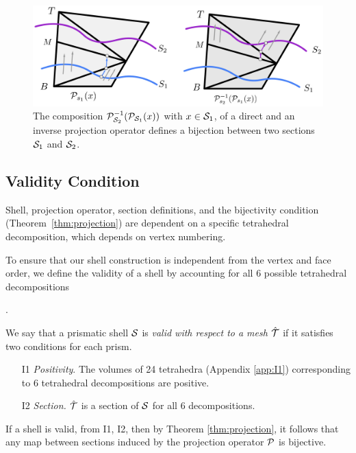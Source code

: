 
\begin{figure}
    \includegraphics[width=\linewidth]{prism-tex/figs/composition}
    \caption{The composition $\P^{-1}_{\S_2}(\P_{\S_1}(x))$ with $x \in \S_1$, of a direct and an inverse projection operator defines a bijection between two sections $\S_1$ and $\S_2$.}
    \label{prism:fig:projection_sections}
    
\end{figure}

{
\subsection{Validity Condition}
\label{prism:sec:strong}

Shell, projection operator, section definitions, and the bijectivity condition (Theorem~\ref{thm:projection}) are dependent on a specific tetrahedral decomposition, which depends on vertex numbering.

To ensure that our shell construction is independent from the vertex and face order, we define the validity of a shell by accounting for all 6 possible tetrahedral decompositions \cite[Figure 4]{dompierre1999subdivide}}.

\begin{definition}\label{def:validshell}
We say that a prismatic shell $\S$ is \emph{valid with respect to a mesh $\hat\T$} if it satisfies two conditions for each prism.
\begin{enumerate}
    \item[I1] \emph{Positivity}. The volumes of  24 tetrahedra (Appendix \ref{app:I1}) corresponding to  6 tetrahedral decompositions are positive.
    \item[I2] \emph{Section.} $\hat\T$ is a section of $\S$ for all 6 decompositions.
\end{enumerate}
\end{definition}
If a shell is valid, from I1, I2, then by Theorem \ref{thm:projection}, it follows that any map between sections induced by the projection operator $\P$ is bijective.

